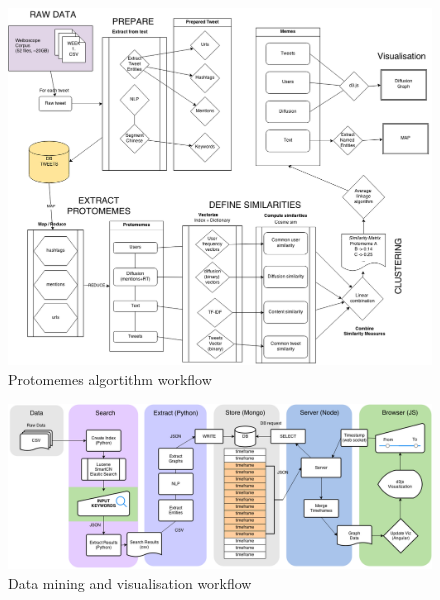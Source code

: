 \begin{landscape}
    \begin{figure}
        \caption{Protomemes algortithm workflow}
        \label{fig:ui-map}
        \centering
        \includegraphics[scale=0.45]{figures/annexes/Protomemesm_workflow.png}
    \end{figure}
\end{landscape}

\begin{landscape}
\begin{figure}
    \caption{Data mining and visualisation workflow}
    \label{fig:ui-map}
    \centering
    \includegraphics[scale=0.59]{figures/annexes/UI_mitras.png}
\end{figure}
\end{landscape}

